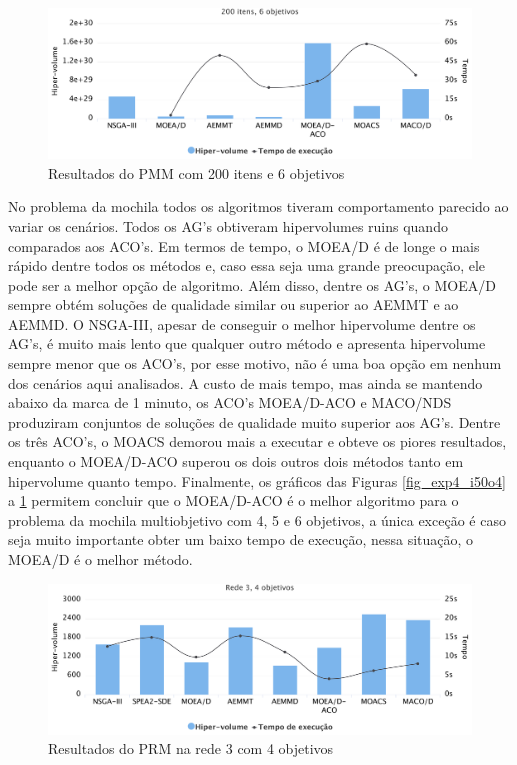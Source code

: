 \begin{figure}[!htbp]
	\includegraphics[width=1\textwidth]{cap_experimentos/figs/etapa4/i200o6}
	\caption{\label{fig_exp4_i200o6}Resultados do PMM com 200 itens e 6 objetivos}
\end{figure}

No problema da mochila todos os algoritmos tiveram comportamento parecido ao variar os cenários. Todos os AG's obtiveram hipervolumes ruins quando comparados aos ACO's. Em termos de tempo, o MOEA/D é de longe o mais rápido dentre todos os métodos e, caso essa seja uma grande preocupação, ele pode ser a melhor opção de algoritmo. Além disso, dentre os AG's, o MOEA/D sempre obtém soluções de qualidade similar ou superior ao AEMMT e ao AEMMD. O NSGA-III, apesar de conseguir o melhor hipervolume dentre os AG's, é muito mais lento que qualquer outro método e apresenta hipervolume sempre menor que os ACO's, por esse motivo, não é uma boa opção em nenhum dos cenários aqui analisados. A custo de mais tempo, mas ainda se mantendo abaixo da marca de 1 minuto, os ACO's MOEA/D-ACO e MACO/NDS produziram conjuntos de soluções de qualidade muito superior aos AG's. Dentre os três ACO's, o MOACS demorou mais a executar e obteve os piores resultados, enquanto o MOEA/D-ACO superou os dois outros dois métodos tanto em hipervolume quanto tempo. Finalmente, os gráficos das Figuras \ref{fig_exp4_i50o4} a \ref{fig_exp4_i200o6} permitem concluir que o MOEA/D-ACO é o melhor algoritmo para o problema da mochila multiobjetivo com 4, 5 e 6 objetivos, a única exceção é caso seja muito importante obter um baixo tempo de execução, nessa situação, o MOEA/D é o melhor método.

\begin{figure}[!htbp]	
	\includegraphics[width=1\textwidth]{cap_experimentos/figs/etapa4/r3o4}
	\caption{\label{fig_exp4_r3o4}Resultados do PRM na rede 3 com 4 objetivos}
\end{figure}

